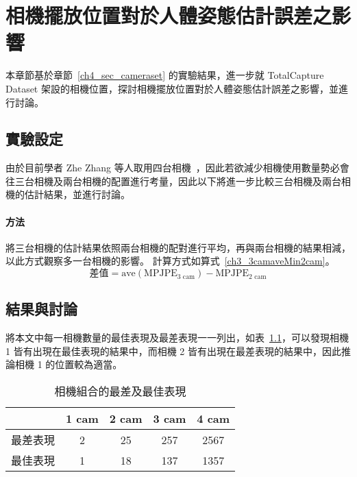 \chapter{相機擺放位置對於人體姿態估計誤差之影響}
\fontsize{12pt}{18pt}\selectfont

本章節基於章節~\ref{ch4_sec_cameraset} 的實驗結果，進一步就 TotalCapture Dataset 架設的相機位置，探討相機擺放位置對於人體姿態估計誤差之影響，並進行討論。

\section{實驗設定}
由於目前學者 Zhe Zhang 等人取用四台相機~\cite{Zhang_2020_CVPR}，因此若欲減少相機使用數量勢必會往三台相機及兩台相機的配置進行考量，因此以下將進一步比較三台相機及兩台相機的估計結果，並進行討論。

\subsubsection*{方法}
將三台相機的估計結果依照兩台相機的配對進行平均，再與兩台相機的結果相減，以此方式觀察多一台相機的影響。
計算方式如算式~\ref{ch3_3camaveMin2cam}。
\begin{equation}
   \label{ch3_3camaveMin2cam}
   \text{差值} = \text{ave}(\text{MPJPE}_{3 \text{ cam}})-\text{MPJPE}_{2 \text{ cam}}
\end{equation}

\section{結果與討論}
將本文中每一相機數量的最佳表現及最差表現一一列出，如表~\ref{ch3_best_worst_camset}，可以發現相機 1 皆有出現在最佳表現的結果中，而相機 2 皆有出現在最差表現的結果中，因此推論相機 1 的位置較為適當。
\begin{table}[!ht]
   \caption[相機組合的最差及最佳表現]{相機組合的最差及最佳表現}
   \centering
   \label{ch3_best_worst_camset}
   \setlength{\tabcolsep}{3pt}
   \renewcommand\arraystretch{1.5}
   \begin{tabular}{c|c|c|c|c}
       & 1 cam & 2 cam & 3 cam & 4 cam \\ 
      \midrule[2pt]
      最差表現 & 2 & 25 & 257 & 2567 \\
      最佳表現 & 1 & 18 & 137 & 1357 \\
   \end{tabular}
\end{table}

